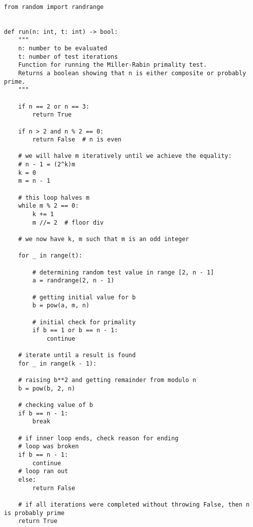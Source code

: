 \documentclass[11pt]{article}
\begin{document}
\lstset{style = MillerRabin}

\begin{lstlisting}

from random import randrange


def run(n: int, t: int) -> bool:
	"""
	n: number to be evaluated
	t: number of test iterations
	Function for running the Miller-Rabin primality test.
	Returns a boolean showing that n is either composite or probably prime.
	"""

	if n == 2 or n == 3:
		return True

	if n > 2 and n % 2 == 0:
		return False  # n is even
	
	# we will halve m iteratively until we achieve the equality:
	# n - 1 = (2^k)m
	k = 0
	m = n - 1
	
	# this loop halves m
	while m % 2 == 0:
		k += 1
		m //= 2  # floor div

	# we now have k, m such that m is an odd integer

	for _ in range(t):

		# determining random test value in range [2, n - 1]
		a = randrange(2, n - 1)
		
		# getting initial value for b
		b = pow(a, m, n)

		# initial check for primality
		if b == 1 or b == n - 1:
			continue

	# iterate until a result is found
	for _ in range(k - 1):

	# raising b**2 and getting remainder from modulo n
	b = pow(b, 2, n)
	
	# checking value of b
	if b == n - 1:
		break

	# if inner loop ends, check reason for ending
	# loop was broken
	if b == n - 1:
		continue
	# loop ran out
	else:
		return False

	# if all iterations were completed without throwing False, then n is probably prime
	return True


\end{lstlisting}

\newpage

\lstset{style = ChebyshevTheta}
\end{document}
